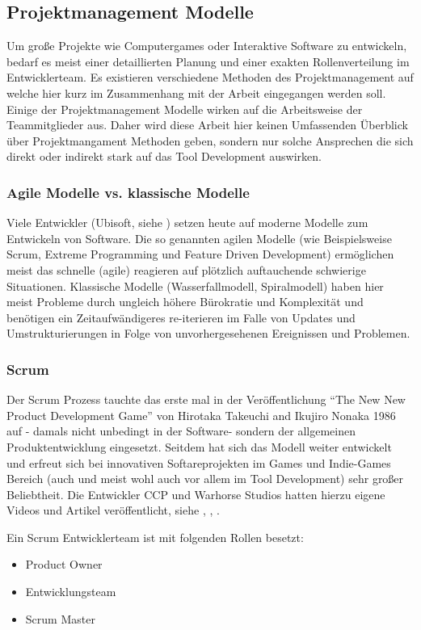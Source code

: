\documentclass[pagesize, paper=a4, fontsize=12pt,titlepage=true, headings=small, headnosepline, abstractoff, liststotoc, nochapterprefix, plainheadsepline, twoside]{scrreprt}
\begin{document}
\subsection{Projektmanagement Modelle}
Um große Projekte wie Computergames oder Interaktive Software zu entwickeln, bedarf es meist einer detaillierten Planung und einer exakten Rollenverteilung im Entwicklerteam. Es existieren verschiedene Methoden des Projektmanagement auf welche hier kurz im Zusammenhang mit der Arbeit eingegangen werden soll. Einige der Projektmanagement Modelle wirken auf die Arbeitsweise der Teammitglieder aus. Daher wird diese Arbeit hier keinen Umfassenden Überblick über Projektmangament Methoden geben, sondern nur solche Ansprechen die sich direkt oder indirekt stark auf das Tool Development auswirken.
\subsubsection{Agile Modelle vs. klassische Modelle}
Viele Entwickler (Ubisoft, siehe \cite{MKG:Schmitz2014}) setzen heute auf moderne Modelle zum Entwickeln von Software. Die so genannten agilen Modelle (wie Beispielsweise Scrum,  Extreme Programming und Feature Driven Development) ermöglichen meist das schnelle (agile) reagieren auf plötzlich auftauchende schwierige Situationen. Klassische Modelle (Wasserfallmodell, Spiralmodell) haben hier meist Probleme durch ungleich höhere Bürokratie und Komplexität und benötigen ein Zeitaufwändigeres re-iterieren im Falle von Updates und Umstrukturierungen in Folge von unvorhergesehenen Ereignissen und Problemen. 
\subsubsection{Scrum}
Der Scrum Prozess tauchte das erste mal in der Veröffentlichung “The New New Product Development Game” von Hirotaka Takeuchi and Ikujiro Nonaka 1986 auf - damals nicht unbedingt in der Software- sondern der allgemeinen Produktentwicklung eingesetzt. Seitdem hat sich das Modell weiter entwickelt und erfreut sich bei innovativen Softareprojekten im Games und Indie-Games Bereich (auch und meist wohl auch vor allem im Tool Development) sehr großer Beliebtheit. Die Entwickler CCP und Warhorse Studios hatten hierzu eigene Videos und Artikel veröffentlicht, siehe \cite{CCP:ScrumAndAgile2009}, \cite{WH:Scrum2013}, \cite{WH:ScrumVideo2013}.

Ein Scrum Entwicklerteam ist mit folgenden Rollen besetzt:
\begin{itemize}
\item Product Owner
\item Entwicklungsteam
\item Scrum Master
\end{itemize}
\end{document}
